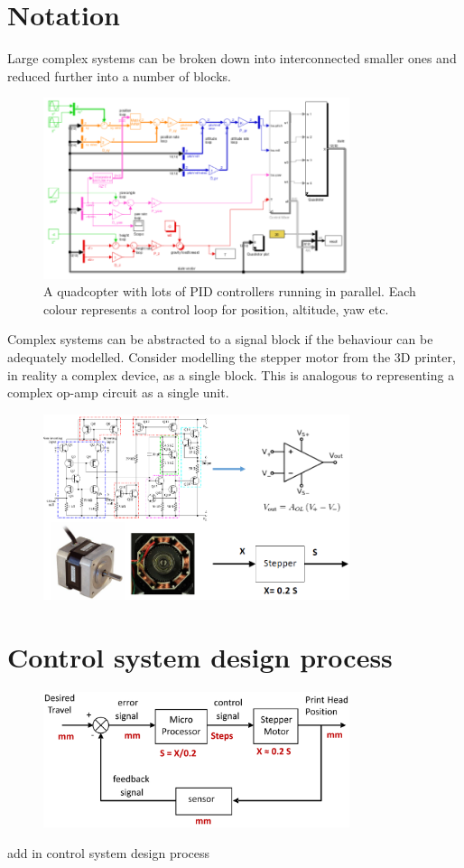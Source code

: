 \documentclass[class=report, crop=false, 12pt,a4paper]{standalone}
\begin{document}
\section{Notation}
Large complex systems can be broken down into interconnected smaller ones and reduced further into a number of blocks. 
\begin{figure}[H]
  \centering
  \includegraphics[width = 0.8\textwidth]{../img/quadcopterexampleblock.png}
  \caption{A quadcopter with lots of PID controllers running in parallel. Each colour represents a control loop for position, altitude, yaw etc.}
\end{figure}
Complex systems can be abstracted to a signal block if the behaviour can be adequately modelled. Consider modelling the stepper motor from the 3D printer, in reality a complex device, as a single block. This is analogous to representing a complex op-amp circuit as a single unit.
\begin{figure}[H]
  \centering
  \includegraphics[width = 0.8\textwidth]{../img/blockdiagram4.png}
\end{figure}
\section{Control system design process}
\begin{figure}
  \centering
  \includegraphics[width = 0.8\textwidth]{../img/controlstrat3dprinterclosed.PNG}
\end{figure}
add in control system design process
\end{document}
